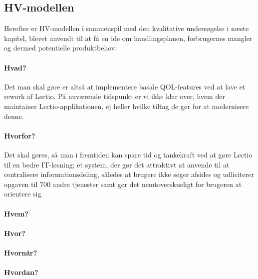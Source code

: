 \subsection{HV-modellen}
Herefter er HV-modellen i sammenspil med den kvalitative undersøgelse i næste kapitel, blevet anvendt til at få en ide om handlingsplanen, forbrugernes mangler og dermed potentielle produktbehov:
\paragraph{Hvad?}
    Det man skal gøre er altså at implementere basale QOL-features ved at lave et rework af Lectio. På nuværende tidspunkt er vi ikke klar over, hvem der maintainer Lectio-applikationen, ej heller hvilke tiltag de gør for at modernisere denne.
\paragraph{Hvorfor?}
    Det skal gøres, så man i fremtiden kan spare tid og tankekraft ved at gøre Lectio til en bedre IT-løsning; et system, der gør det attraktivt at anvende til at centralisere informationsdeling, således at brugere ikke søger afsides og udliciterer opgaven til 700 andre tjenester samt gør det nemtoverskueligt for brugeren at orientere sig. 
\paragraph{Hvem?}
\paragraph{Hvor?}
\paragraph{Hvornår?}
\paragraph{Hvordan?}